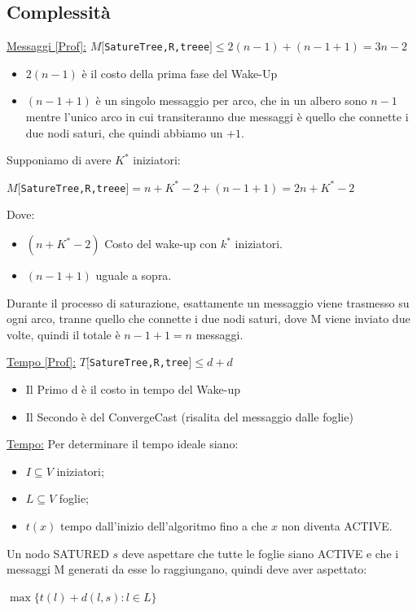 \subsection{Complessità}
\underline{Messaggi [Prof]:}
$M[$\texttt{SatureTree,R,treee}$] \leq 2(n-1) + (n-1+1) = 3n - 2$
\begin{itemize}
    \item $2(n-1)$ è il costo della prima fase del Wake-Up
    \item $(n-1+1)$ è un singolo messaggio per arco, che in un albero sono $n-1$ mentre l'unico arco in cui transiteranno due messaggi è quello che connette i due nodi saturi, che quindi abbiamo un $+1$.
\end{itemize}
Supponiamo di avere $K^*$ iniziatori:
\begin{center}
  $M[$\texttt{SatureTree,R,treee}$] = n + K^* - 2 + (n-1+1) = 2n + K^* -2$\\
\end{center}
Dove:
\begin{itemize}
    \item $(n + K^* - 2)$ Costo del wake-up con $k^*$ iniziatori.
    \item $(n-1+1)$ uguale a sopra.
\end{itemize}

Durante il processo di saturazione, esattamente un messaggio viene trasmesso su ogni arco, tranne quello che connette i due nodi saturi, dove M viene inviato due volte, quindi il totale è $n-1+1 = n$ messaggi.


\underline{Tempo [Prof]:}
$T[$\texttt{SatureTree,R,tree}$] \leq d + d$
\begin{itemize}
    \item Il Primo d è il costo in tempo del Wake-up
    \item Il Secondo è del ConvergeCast (risalita del messaggio dalle foglie)
\end{itemize}
\underline{Tempo:}
Per determinare il tempo ideale siano:
\begin{itemize}
 \item $I \subseteq V$ iniziatori;
 \item $L \subseteq V$ foglie;
 \item $t(x)$ tempo dall'inizio dell'algoritmo fino a che $x$ non diventa ACTIVE.
\end{itemize}

Un nodo SATURED $s$ deve aspettare che tutte le foglie siano ACTIVE e che i messaggi M generati da esse lo raggiungano, quindi deve aver aspettato:
\begin{center}
  $\max \lbrace t(l) + d(l,s) : l \in L \rbrace$
\end{center}

